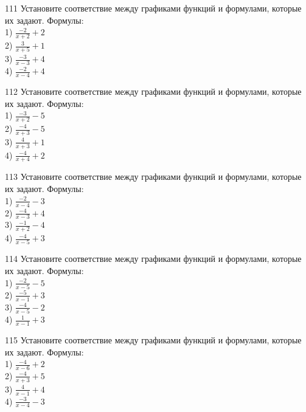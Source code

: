 \documentclass[4apaper]{article}
\begin{document}
\begin{taskBN}{111}
Установите соответствие между графиками функций и формулами, которые их задают. Формулы: \\1) $\frac{-2}{x+2}+2$\\2) $\frac{3}{x+5}+1$\\3) $\frac{-3}{x-3}+4$\\4) $\frac{-2}{x-4}+4$
\end{taskBN}

\begin{taskBN}{112}
Установите соответствие между графиками функций и формулами, которые их задают. Формулы: \\1) $\frac{-3}{x+2}-5$\\2) $\frac{-4}{x+3}-5$\\3) $\frac{4}{x+3}+1$\\4) $\frac{-4}{x+4}+2$
\end{taskBN}

\begin{taskBN}{113}
Установите соответствие между графиками функций и формулами, которые их задают. Формулы: \\1) $\frac{-2}{x-4}-3$\\2) $\frac{-4}{x-3}+4$\\3) $\frac{-1}{x+2}-4$\\4) $\frac{-4}{x-5}+3$
\end{taskBN}

\begin{taskBN}{114}
Установите соответствие между графиками функций и формулами, которые их задают. Формулы: \\1) $\frac{-2}{x-5}-5$\\2) $\frac{-5}{x-1}+3$\\3) $\frac{-4}{x-5}-2$\\4) $\frac{1}{x-1}+3$
\end{taskBN}

\begin{taskBN}{115}
Установите соответствие между графиками функций и формулами, которые их задают. Формулы: \\1) $\frac{-4}{x-6}+2$\\2) $\frac{-4}{x+3}+5$\\3) $\frac{4}{x-1}+4$\\4) $\frac{-3}{x-4}-3$
\end{taskBN}
\end{document}
